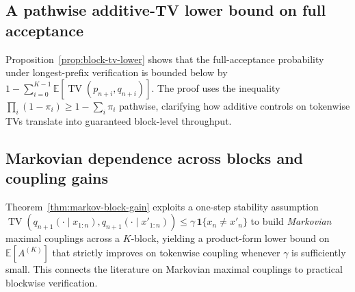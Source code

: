 \documentclass[twoside]{article}
\theoremstyle{plain}
\theoremstyle{definition}
\theoremstyle{remark}
\newcommand{\TV}{\operatorname{TV}}
\newcommand{\E}{\mathbb{E}}
\begin{document}


\subsection{A pathwise additive-TV lower bound on full acceptance}

Proposition~\ref{prop:block-tv-lower} shows that the full-acceptance probability under longest-prefix verification is bounded below by $1-\sum_{i=0}^{K-1}\E[\TV(p_{n+i},q_{n+i})]$. The proof uses the inequality $\prod_i(1-\pi_i)\ge 1-\sum_i\pi_i$ pathwise, clarifying how additive controls on tokenwise TVs translate into guaranteed block-level throughput.

\subsection{Markovian dependence across blocks and coupling gains}

Theorem~\ref{thm:markov-block-gain} exploits a one-step stability assumption $\TV(q_{n+1}(\cdot\mid x_{1:n}),q_{n+1}(\cdot\mid x'_{1:n}))\le \gamma\,\mathbf{1}\{x_n\ne x'_n\}$ to build \emph{Markovian} maximal couplings across a $K$-block, yielding a product-form lower bound on $\E[A^{(K)}]$ that strictly improves on tokenwise coupling whenever $\gamma$ is sufficiently small. This connects the literature on Markovian maximal couplings \cite{BanerjeeKendall2016Rigidity,Boettcher2017MMC} to practical blockwise verification.


\end{document}
